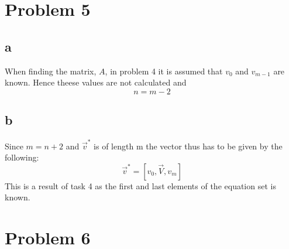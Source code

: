\documentclass[english,notitlepage]{revtex4-1}  %
\begin{document}
\section*{Problem 5}
    \subsection*{a}
        \label{sec:oppgave5a}
        When finding the matrix, $A$, in problem 4 it is assumed that $v_0$ and $v_{m - 1}$ are known.
        Hence theese values are not calculated and
        \begin{equation*}
                n
            =   m - 2
        \end{equation*}
    
    \subsection*{b}
        \label{sec:5b}
        Since $m = n+2 $ and $\vec{v}^* $ is of length m the vector thus has to be given by the following: 
        \begin{equation}
            \vec{v}^* = \left[v_0, \vec{V}, v_m \right]
        \end{equation}
        This is a result of task 4 as the first and last elements of the equation set is known. 
        

\section*{Problem 6}
\end{document}
